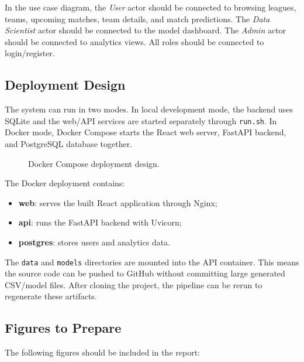 In the use case diagram, the \textit{User} actor should be connected to browsing leagues, teams, upcoming matches, team details, and match predictions. The \textit{Data Scientist} actor should be connected to the model dashboard. The \textit{Admin} actor should be connected to analytics views. All roles should be connected to login/register.

\subsection{Deployment Design}
\label{subsec:deployment-design}

The system can run in two modes. In local development mode, the backend uses SQLite and the web/API services are started separately through \texttt{run.sh}. In Docker mode, Docker Compose starts the React web server, FastAPI backend, and PostgreSQL database together.

\begin{figure}[htbp]
    \centering
    \caption{Docker Compose deployment design.}
    \label{fig:deployment-diagram}
\end{figure}

The Docker deployment contains:

\begin{itemize}
    \item \textbf{web}: serves the built React application through Nginx;
    \item \textbf{api}: runs the FastAPI backend with Uvicorn;
    \item \textbf{postgres}: stores users and analytics data.
\end{itemize}

The \texttt{data} and \texttt{models} directories are mounted into the API container. This means the source code can be pushed to GitHub without committing large generated CSV/model files. After cloning the project, the pipeline can be rerun to regenerate these artifacts.

\subsection{Figures to Prepare}
\label{subsec:figures-to-prepare}

The following figures should be included in the report:

